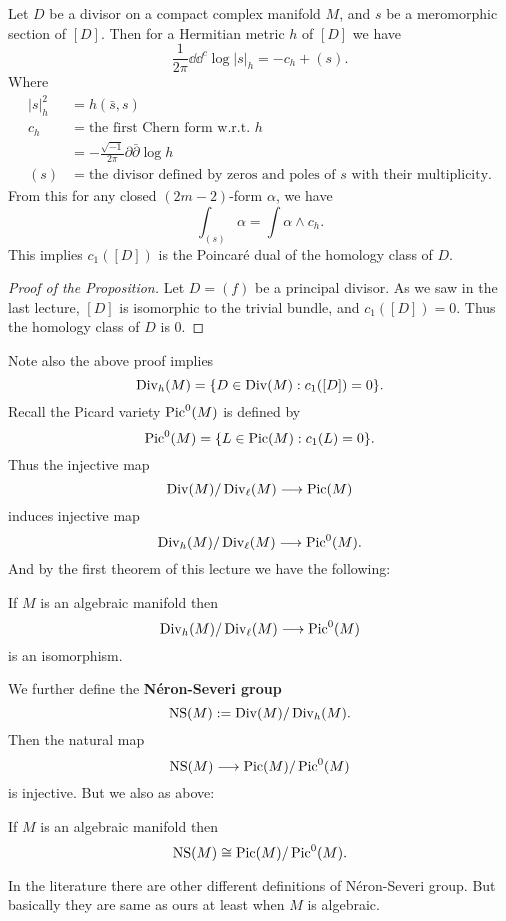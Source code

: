 \documentclass[12pt]{article}
\begin{document}
Let \(D\) be a divisor on a compact complex manifold \(M\), and \(s\) be a meromorphic
section of \([D]\). Then for a Hermitian metric \(h\) of \([D]\) we have \[
  \frac{1}{2\pi}\dd \dd^c \log|s|_h=-c_h+(s)
.\] Where
\begin{align*}
  |s|^2_h&=h(\bar{s},s) \\
  c_h&=\text{the first Chern form w.r.t. }h \\
  &=-\frac{\sqrt{-1}}{2\pi}\partial\bar{\partial}\log h \\
  (s)&=\text{the divisor defined by zeros and poles of }s\text{ with their
  multiplicity}
.\end{align*}
From this for any closed \((2m-2)\)-form \(\alpha\), we have \[
  \int_{(s)}\alpha=\int \alpha\wedge c_h
.\] This implies \(c_1([D])\) is the Poincaré dual of the homology class of \(D\).

\begin{proof}[Proof of the Proposition]
  Let \(D=(f)\) be a principal divisor. As we saw in the last lecture, \([D]\) is
  isomorphic to the trivial bundle, and \(c_1([D])=0\). Thus the homology class
  of \(D\) is 0.
\end{proof}

Note also the above proof implies \[
  \operatorname{Div}_h(M)=\{D\in \operatorname{Div}(M):c_1([D])=0\}
.\] Recall the Picard variety \(\operatorname{Pic}^0(M)\) is defined by \[
  \operatorname{Pic}^0(M)=\{L\in \operatorname{Pic}(M):c_1(L)=0\}
.\] Thus the injective map \[
  \operatorname{Div}(M)/\operatorname{Div}_\ell(M)\longrightarrow \operatorname{Pic}(M)
\] induces injective map \[
  \operatorname{Div}_h(M)/\operatorname{Div}_\ell(M)\longrightarrow \operatorname{Pic}^0(M)
.\] And by the first theorem of this lecture we have the following:
\begin{theorem}
  If \(M\) is an algebraic manifold then \[
    \operatorname{Div}_h(M)/\operatorname{Div}_\ell(M)\longrightarrow \operatorname{Pic}^0(M)
  \] is an isomorphism.
\end{theorem}
We further define the \textbf{Néron-Severi group} \[
  \operatorname{NS}(M):=\operatorname{Div}(M)/\operatorname{Div}_h(M)
.\] Then the natural map \[
  \operatorname{NS}(M)\longrightarrow \operatorname{Pic}(M)/\operatorname{Pic}^0(M)
\] is injective. But we also as above:
\begin{theorem}
  If \(M\) is an algebraic manifold then \[
    \operatorname{NS}(M)\cong\operatorname{Pic}(M)/\operatorname{Pic}^0(M)
  .\]
\end{theorem}

\begin{remark}
  In the literature there are other different definitions of Néron-Severi group.
  But basically they are same as ours at least when \(M\) is algebraic.
\end{remark}
\end{document}

